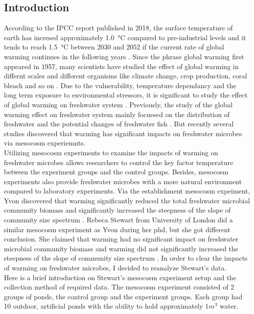 \documentclass[11pt]{article}
\begin{document}
\begin{linenumbers}
\section*{Introduction}
According to the IPCC report published in 2018, the surface temperature of earth has incresed approximately \SI{1.0}{\celsius} compared to pre-industrial levels and it tends to reach \SI{1.5}{\celsius} between 2030 and 2052 if the current rate of global warming continues in the following years \cite{IPCC}.
Since the phrase global warming first appeared in 1957, many scientists have studied the effect of global warming in differnt scales and different organisms like climate change, crop production, coral bleach and so on \cite{weart2009discovery}.
Due to the vulnerability, temperature dependancy and the long term exposure to environmental stressors, it is significant to study the effect of global warming on freshwater system \cite{arnell1996effects}.
Previously, the study of the global warming effect on freshwater system mainly focuesed on the distribution of freshwater and the potential changes of freshwater fish \cite{carpenter1992global}.
But recently several studies discovered that warming has significant impacts on freshwater microbes via mesocosm experiemnts. \\
Utilizing mesocosm experiments to examine the impacts of warming on freshwater microbes allows researchers to control the key factor temperature between the experiment groups and the control groups.
Besides, mesocosm experiments also provide freshwater microbes with a more natural environment compared to laboratory experiments. Via the establishment mesocosm expeiment, Yvon discovered that warming significantly reduced the total freshwater microbial community biomass and significantly increased the steepness of the slope of community size spectrum \cite{yvon2011warming}.
Rebeca Stewart from University of London did a similar mesocosm experiment as Yvon during her phd, but she got different conclusion. She claimed that warming had no significant impact on freshwater microbial community biomass and warming did not significantly increased the steepness of the slope of community size spectrum \cite{rebecca}.
In order to clear the impacts of warming on freshwater microbes, I decided to reanalyze Stewart's data. \\
Here is a brief introduction on Stewart's mesocosm experiment setup and the collection method of required data.
The mesocosm experiment consisted of 2 groups of ponds, the control group and the experiment groups. Each group had 10 outdoor, artificial ponds with the ability to hold approximately \( 1 m^3\) water.

\end{linenumbers}
\end{document}
